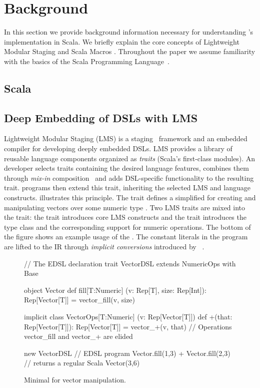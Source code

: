 \section{Background}
\label{sec:background}
In this section we provide background information necessary for understanding \yy's
implementation in Scala. We briefly explain the core concepts of Lightweight Modular Staging
\cite{rompf_lightweight_2012,rompf_optimizing_2013} and Scala Macros
\cite{burmako_scala_2013}. Throughout the paper we assume familiarity with
the basics of the Scala Programming Language~\cite{odersky_scala_2004}.
\subsection{Scala}
\subsection{Deep Embedding of DSLs with LMS}
\label{subsec:deep-embedding}

Lightweight Modular Staging (LMS) is a
staging~\cite{taha_multi-stage_1997} framework and an embedded
compiler for developing deeply embedded DSLs.  LMS provides a library
of reusable language components organized as \emph{traits} (Scala's
first-class modules).  An \edsl developer selects traits containing
the desired language features, combines them through \emph{mix-in}
composition~\cite{odersky_scalable_2005} and adds DSL-specific
functionality to the resulting \edsl trait.  \edsl programs then
extend this trait, inheriting the selected LMS and \edsl language
constructs.  illustrates this principle.  The trait
 defines a simplified \edsl for creating and
manipulating vectors over some numeric type .  Two LMS traits
are mixed into the  trait: the  trait
introduces core LMS constructs %
and the  trait introduces the  type
class and the corresponding support for numeric operations.  The
bottom of the figure shows an example usage of the \edsl. The constant
literals in the program are lifted to the IR through \emph{implicit
  conversions} introduced by
~\cite{oliveira_type_2010}.

\begin{figure}
\begin{listingtiny}
// The EDSL declaration
trait VectorDSL extends NumericOps with Base {
  object Vector {
    def fill[T:Numeric]
      (v: Rep[T], size: Rep[Int]): Rep[Vector[T]] =
      vector_fill(v, size)
  }

  implicit class VectorOps[T:Numeric]
    (v: Rep[Vector[T]]) {
    def +(that: Rep[Vector[T]]): Rep[Vector[T]] =
      vector_+(v, that)
  }
  // Operations vector_fill and vector_+ are elided
}

new VectorDSL { // EDSL program
  Vector.fill(1,3) + Vector.fill(2,3)
} // returns a regular Scala Vector(3,6)
\end{listingtiny}
\caption{\label{lst:lms} Minimal \edsl for vector manipulation.}
\end{figure}

